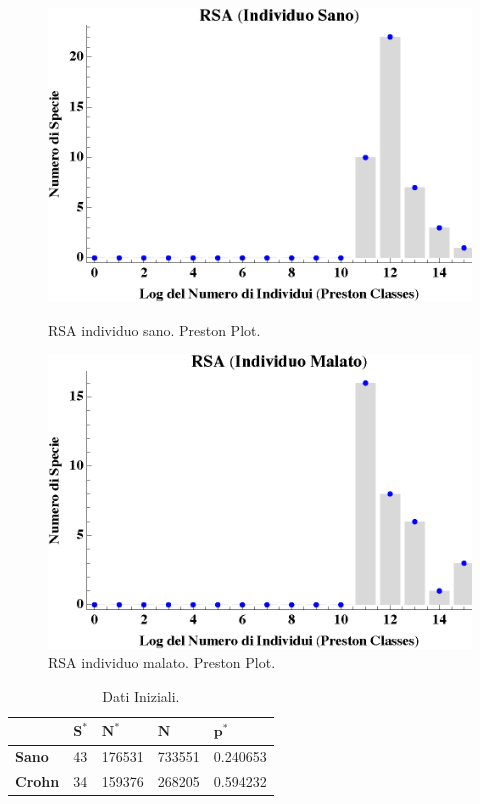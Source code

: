 \begin{figure}[H]
  \centering
  \begin{minipage}[b]{0.45\textwidth}
    \includegraphics[width=\textwidth]{Figure/RSAH.eps}
    \caption{RSA individuo sano. Preston Plot.}
    \label{fig:RSAH}
  \end{minipage}
  \hfill
  \begin{minipage}[b]{0.45\textwidth}
    \includegraphics[width=\textwidth]{Figure/RSAC.eps}
    \caption{RSA individuo malato. Preston Plot.}
    \label{fig:RSAC}
  \end{minipage}
\end{figure}

\begin{table}[H]
\centering
\begin{tabular}{l|l|l|l|l|}
\cline{2-5}
                                     & $\mathbf{S^*}$ & $\mathbf{N^*}$ & $\mathbf{N}$ & $\mathbf{p^*}$ \\ \hline
\multicolumn{1}{|l|}{\textbf{Sano}}  & 43                & 176531               & 733551           & 0.240653    \\ \hline
\multicolumn{1}{|l|}{\textbf{Crohn}} & 34                & 159376               & 268205           & 0.594232    \\ \hline
\end{tabular}
\caption{Dati Iniziali.}
\label{Tab:dati}
\end{table}

